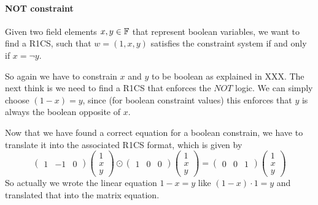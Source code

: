 \paragraph{NOT constraint}
Given two field elements $x,y\in\mathbb{F}$ that represent boolean variables, we want to find a R1CS, such that $w=(1,x,y)$ satisfies the constraint system if and only if $x=\lnot y$. 

So again we have to constrain $x$ and $y$ to be boolean as explained in XXX. The next think is we need to find a R1CS that enforces the $NOT$ logic. We can simply choose $(1-x) =y$, since (for boolean constraint values) this enforces that $y$ is always the boolean opposite of $x$. 

Now that we have found a correct equation for a boolean constrain, we have to translate it into the associated R1CS format, which is given by 
$$
\begin{pmatrix}1 & -1 & 0 \end{pmatrix} \begin{pmatrix} 1 \\ x \\ y \end{pmatrix}\odot
\begin{pmatrix}1 & 0 & 0 \end{pmatrix} \begin{pmatrix} 1 \\ x \\ y \end{pmatrix} =
\begin{pmatrix}0 & 0 & 1 \end{pmatrix}\begin{pmatrix} 1 \\ x \\ y \end{pmatrix}
$$
So actually we wrote the linear equation $1-x=y$ like $(1-x)\cdot 1 = y$ and translated that into the matrix equation.

